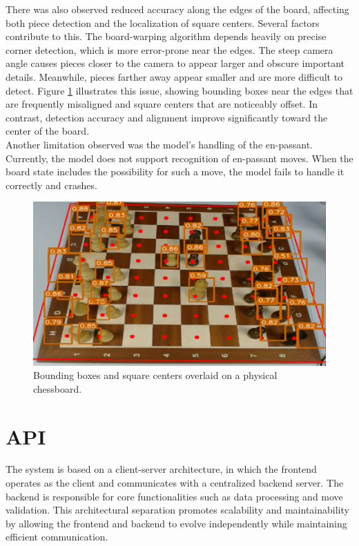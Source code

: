 There was also observed reduced accuracy along the edges of the board, affecting both piece detection and the localization of square centers. Several factors contribute to this. The board-warping algorithm depends heavily on precise corner detection, which is more error-prone near the edges. The steep camera angle causes pieces closer to the camera to appear larger and obscure important details. Meanwhile, pieces farther away appear smaller and are more difficult to detect. Figure \ref{fig:bbox-centers-incorrect} illustrates this issue, showing bounding boxes near the edges that are frequently misaligned and square centers that are noticeably offset. In contrast, detection accuracy and alignment improve significantly toward the center of the board. \\

Another limitation observed was the model's handling of the \gls{en-passant}. Currently, the model does not support recognition of \gls{en-passant} moves. When the board state includes the possibility for such a move, the model fails to handle it correctly and crashes.


\begin{figure}[h!]
    \centering
    \includegraphics[width=0.75\linewidth]{figures/discussion/bbox-centers-incorrect.png}
    \caption[Bounding box and square center misalignment]{Bounding boxes and square centers overlaid on a physical chessboard.}
    \label{fig:bbox-centers-incorrect}
\end{figure}


\section{API}
The system is based on a client-server architecture, in which the frontend operates as the client and communicates with a centralized backend server. The backend is responsible for core functionalities such as data processing and move validation. This architectural separation promotes scalability and maintainability by allowing the frontend and backend to evolve independently while maintaining efficient communication. \\

